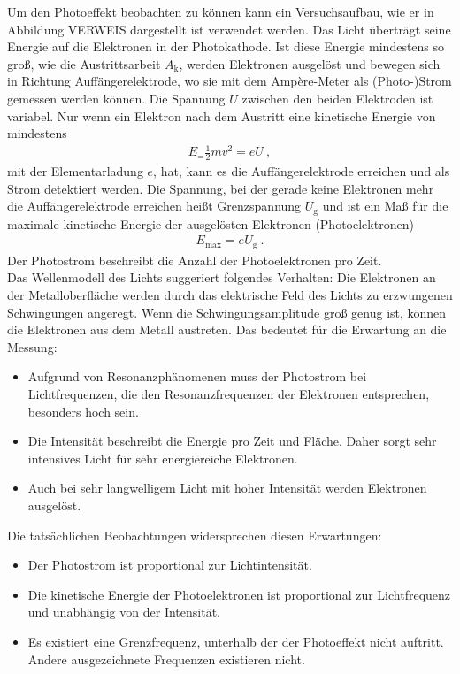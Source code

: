 Um den Photoeffekt beobachten zu können kann ein Versuchsaufbau, wie er in Abbildung VERWEIS dargestellt ist verwendet werden. Das Licht überträgt seine Energie auf die Elektronen in der Photokathode. Ist diese Energie mindestens so groß, wie die Austrittsarbeit $A_\text{k}$, werden Elektronen ausgelöst und bewegen sich in Richtung Auffängerelektrode, wo sie mit dem Ampère-Meter als (Photo-)Strom gemessen werden können. Die Spannung $U$ zwischen den beiden Elektroden ist variabel. Nur wenn ein Elektron nach dem Austritt eine kinetische Energie von mindestens
\begin{align}
	E_ = \frac{1}{2}mv^2 = eU \ ,
\end{align}
mit der Elementarladung $e$, hat, kann es die Auffängerelektrode erreichen und als Strom detektiert werden. Die Spannung, bei der gerade keine Elektronen mehr die Auffängerelektrode erreichen heißt Grenzspannung $U_\text{g}$ und ist ein Maß für die maximale kinetische Energie der ausgelösten Elektronen (Photoelektronen)
\begin{align}
	E_\text{max} = eU_\text{g} \ .
\end{align}
Der Photostrom beschreibt die Anzahl der Photoelektronen pro Zeit. \\
Das Wellenmodell des Lichts suggeriert folgendes Verhalten: Die Elektronen an der Metalloberfläche werden durch das elektrische Feld des Lichts zu erzwungenen Schwingungen angeregt. Wenn die Schwingungsamplitude groß genug ist, können die Elektronen aus dem Metall austreten. Das bedeutet für die Erwartung an die Messung:
\begin{itemize}
	\item Aufgrund von Resonanzphänomenen muss der Photostrom bei Lichtfrequenzen, die den Resonanzfrequenzen der Elektronen entsprechen, besonders hoch sein.
	\item Die Intensität beschreibt die Energie pro Zeit und Fläche. Daher sorgt sehr intensives Licht für sehr energiereiche Elektronen.
	\item Auch bei sehr langwelligem Licht mit hoher Intensität werden Elektronen ausgelöst.
\end{itemize}
Die tatsächlichen Beobachtungen widersprechen diesen Erwartungen:
\begin{itemize}
	\item Der Photostrom ist proportional zur Lichtintensität.
	\item Die kinetische Energie der Photoelektronen ist proportional zur Lichtfrequenz und unabhängig von der Intensität.
	\item Es existiert eine Grenzfrequenz, unterhalb der der Photoeffekt nicht auftritt. Andere ausgezeichnete Frequenzen existieren nicht.
\end{itemize}

